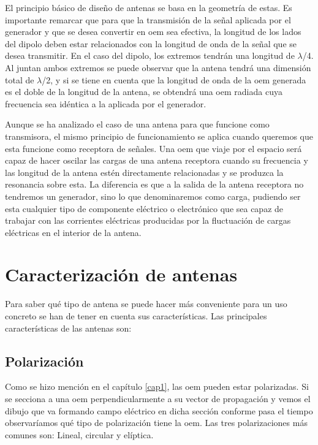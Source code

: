 \par El principio básico de diseño de antenas se basa en la geometría de estas. Es importante remarcar que para que la transmisión de la señal aplicada por el generador y que se desea convertir en \gls{oem} sea efectiva, la longitud de los lados del dipolo deben estar relacionados con la longitud de onda de la señal que se desea transmitir. En el caso del dipolo, los extremos tendrán una longitud de $\lambda$/4. Al juntan ambos extremos se puede observar que la antena tendrá una dimensión total de $\lambda$/2, y si se tiene en cuenta que la longitud de onda de la \gls{oem} generada es el doble de la longitud de la antena, se obtendrá una \gls{oem} radiada cuya frecuencia sea idéntica a la aplicada por el generador. 
\\
\par Aunque se ha analizado el caso de una antena para que funcione como transmisora, el mismo principio de funcionamiento se aplica cuando queremos que esta funcione como receptora de señales. Una \gls{oem} que viaje por el espacio será capaz de hacer oscilar las cargas de una antena receptora cuando su frecuencia y las longitud de la antena estén directamente relacionadas y se produzca la resonancia sobre esta. La diferencia es que a la salida de la antena receptora no tendremos un generador, sino lo que denominaremos como carga, pudiendo ser esta cualquier tipo de componente eléctrico o electrónico que sea capaz de trabajar con las corrientes eléctricas producidas por la fluctuación de cargas eléctricas en el interior de la antena.

\section{Caracterización de antenas}
\par Para saber qué tipo de antena se puede hacer más conveniente para un uso concreto se han de tener en cuenta sus características. Las principales características de las antenas son: \cite{Carcamo2014, Cardama2002, JaumeAnguera2008}

\subsection{Polarización}
\par Como se hizo mención en el capítulo \ref{cap1}, las \gls{oem} pueden estar polarizadas. Si se secciona a una \gls{oem} perpendicularmente a su vector de propagación y vemos el dibujo que va formando campo eléctrico en dicha sección conforme pasa el tiempo observaríamos qué tipo de polarización tiene la \gls{oem}. Las tres polarizaciones más comunes son: Lineal, circular y elíptica.

